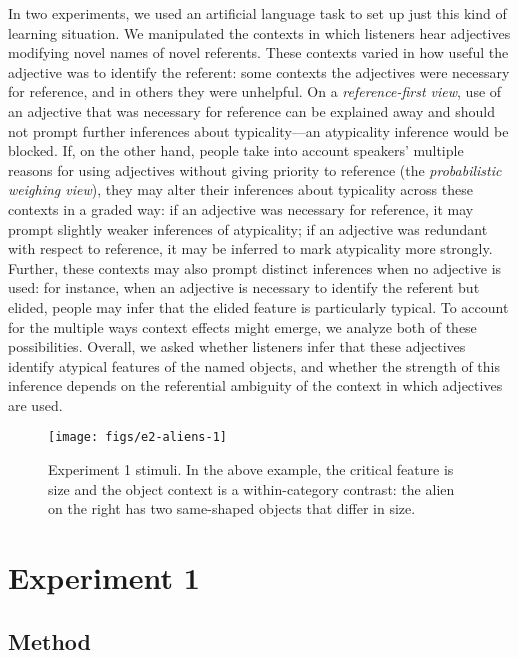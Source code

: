 \documentclass{ucetd}
\begin{document}
In two experiments, we used an artificial language task to set up just
this kind of learning situation. We manipulated the contexts in which
listeners hear adjectives modifying novel names of novel referents.
These contexts varied in how useful the adjective was to identify the
referent: some contexts the adjectives were necessary for reference, and
in others they were unhelpful. On a \emph{reference-first view}, use of
an adjective that was necessary for reference can be explained away and
should not prompt further inferences about typicality---an atypicality
inference would be blocked. If, on the other hand, people take into
account speakers' multiple reasons for using adjectives without giving
priority to reference (the \emph{probabilistic weighing view}), they may
alter their inferences about typicality across these contexts in a
graded way: if an adjective was necessary for reference, it may prompt
slightly weaker inferences of atypicality; if an adjective was redundant
with respect to reference, it may be inferred to mark atypicality more
strongly. Further, these contexts may also prompt distinct inferences
when no adjective is used: for instance, when an adjective is necessary
to identify the referent but elided, people may infer that the elided
feature is particularly typical. To account for the multiple ways
context effects might emerge, we analyze both of these possibilities.
Overall, we asked whether listeners infer that these adjectives identify
atypical features of the named objects, and whether the strength of this
inference depends on the referential ambiguity of the context in which
adjectives are used.

\begin{figure}[!tb]

{\centering \texttt{[image: figs/e2-aliens-1]} 

}

\caption{Experiment 1 stimuli. In the above example, the critical feature is size and the object context is a within-category contrast: the alien on the right has two same-shaped objects that differ in size.}\label{fig:e2-aliens}
\end{figure}

\hypertarget{experiment-1}{%
\section{Experiment 1}\label{experiment-1}}

\hypertarget{method-1}{%
\subsection{Method}\label{method-1}}
\end{document}
